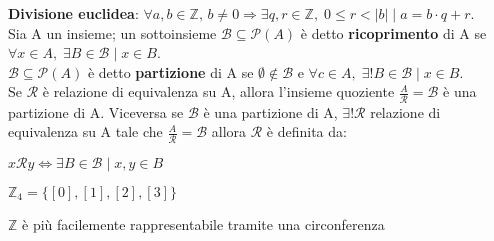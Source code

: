 \textbf{Divisione euclidea}: $\forall a,b \in \mathbb{Z}, \, b \neq 0 \Rightarrow \exists q,r \in \mathbb{Z}, \; 0 \leq r < |b| \; | \; a = b \cdot q + r$. \\
Sia A un insieme; un sottoinsieme $\mathcal{B} \subseteq \mathcal{P}(A)$ è detto \textbf{ricoprimento} di A se $\forall x \in A, \; \exists B \in \mathcal{B} \; | \; x \in B$. \\
$\mathcal{B} \subseteq \mathcal{P}(A)$ è detto \textbf{partizione} di A se $\emptyset \notin \mathcal{B}$ e $\forall c \in A, \; \exists ! B \in \mathcal{B} \; | \; x \in B$. \\
Se $\mathcal{R}$ è relazione di equivalenza su A, allora l'insieme quoziente $\frac{A}{\mathcal{R}} = \mathcal{B}$ è una partizione di A. 
Viceversa se $\mathcal{B}$ è una partizione di A, $\exists ! \mathcal{R}$ relazione di equivalenza su A tale che $\frac{A}{\mathcal{R}} = \mathcal{B}$ allora $\mathcal{R}$ è definita da:
\begin{center}
    $x\mathcal{R}y \Leftrightarrow \exists B \in \mathcal{B} \; | \; x, y \in B$
\end{center}

\begin{boxA}
    \begin{minipage}[t]{0.45\textwidth}
        \centering
        $\mathbb{Z}_4 = \{[0], [1], [2], [3]\}$
    \hfill
    \end{minipage}
    \begin{minipage}[t]{0.45\textwidth}
        \centering
    $\mathbb{Z}$ è più facilemente rappresentabile tramite una circonferenza
    \end{minipage}
\end{boxA}